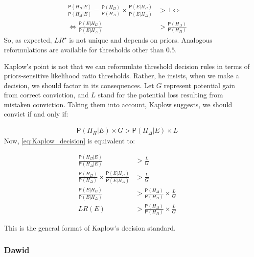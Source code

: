 \documentclass[
  10pt,
  dvipsnames,enabledeprecatedfontcommands]{scrartcl}
\newcommand{\pr}[1]{\mathsf{P}(#1)}
\begin{document}
\vspace{-6mm}

\begin{align*}
\frac{\pr{H_\Pi\vert E}}{\pr{H_\Delta\vert E}} =  \frac{\pr{H_\Pi}}{\pr{H_\Delta}}\times \frac{\pr{E\vert H_\Pi}}{\pr{E\vert H_\Delta}} &>1 \Leftrightarrow\\
  \Leftrightarrow \frac{\pr{E\vert H_\Pi}}{\pr{E\vert H_\Delta}} &> \frac{\pr{H_\Delta}}{\pr{H_\Pi}} 
 \end{align*} \noindent So, as expected, \(LR^\star\) is not unique and
depends on priors. Analogous reformulations are available for thresholds
other than \(0.5\).

Kaplow's point is not that we can reformulate threshold decision rules
in terms of priors-sensitive likelihood ratio thresholds. Rather, he
insists, when we make a decision, we should factor in its consequences.
Let \(G\) represent potential gain from correct conviction, and \(L\)
stand for the potential loss resulting from mistaken conviction. Taking
them into account, Kaplow suggests, we should convict if and only if:

\vspace{-6mm}

\begin{align}
\label{eq:Kaplow_decision}
\pr{H_\Pi\vert E}\times G > \pr{H_\Delta\vert E}\times L
\end{align} \noindent Now, \eqref{eq:Kaplow_decision} is equivalent to:

\vspace{-6mm}

\begin{align}
\nonumber
\frac{\pr{H_\Pi \vert E}}{\pr{H_\Delta \vert E}} & > \frac{L}{G}\\
\nonumber
\frac{\pr{H_\Pi}}{\pr{H_\Delta}} \times \frac{\pr{E\vert H_\Pi}}{\pr{E\vert H_\Delta}} &> \frac{L}{G}\\
\nonumber
\frac{\pr{E\vert H_\Pi}}{\pr{E\vert H_\Delta}}  & > \frac{\pr{H_\Delta}}{\pr{H_\Pi}} \times \frac{L}{G}\\
\label{eq:Kaplow_decision2} LR(E)  & > \frac{\pr{H_\Delta}}{\pr{H_\Pi}} \times \frac{L}{G}
\end{align}

\noindent This is the general format of Kaplow's decision standard.

\hypertarget{dawid}{%
\subsubsection{Dawid}\label{dawid}}
\end{document}
